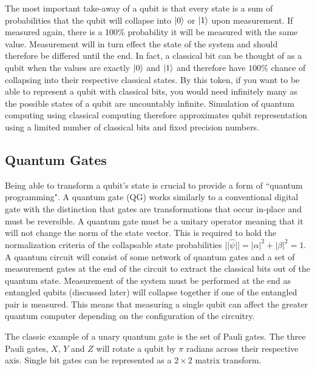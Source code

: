 \documentclass[conference]{IEEEtran}
\begin{document}
The most important take-away of a qubit is that every state is a sum of probabilities that the qubit will collapse into $\ket{0}$ or $\ket{1}$ upon measurement. If measured again, there is a 100\% probability it will be measured with the same value. Measurement will in turn effect the state of the system and should therefore be differed until the end. In fact, a classical bit can be thought of as a qubit when the values are exactly $\ket{0}$ and $\ket{1}$ and therefore have $100 \%$ chance of collapsing into their respective classical states. By this token, if you want to be able to represent a qubit with classical bits, you would need infinitely many as the possible states of a qubit are uncountably infinite. Simulation of quantum computing using classical computing therefore approximates qubit representation using a limited number of classical bits and fixed precision numbers.

\subsection{Quantum Gates}

Being able to transform a qubit's state is crucial to provide a form of ``quantum programming". A quantum gate (QG) works similarly to a conventional digital gate with the distinction that gates are transformations that occur in-place and must be reversible. A quantum gate must be a unitary operator meaning that it will not change the norm of the state vector. This is required to hold the normalization criteria of the collapsable state probabilities $||\hat{\psi}|| = |\alpha|^2 + |\beta|^2 = 1$. A quantum circuit will consist of some network of quantum gates and a set of measurement gates at the end of the circuit to extract the classical bits out of the quantum state. Measurement of the system must be performed at the end as entangled qubits (discussed later) will collapse together if one of the entangled pair is measured. This means that measuring a single qubit can affect the greater quantum computer depending on the configuration of the circuitry.

The classic example of a unary quantum gate is the set of Pauli gates. The three Pauli gates, $X$, $Y$ and $Z$ will rotate a qubit by $\pi$ radians across their respective axis. Single bit gates can be represented as a $2 \times 2$ matrix transform.
\end{document}
